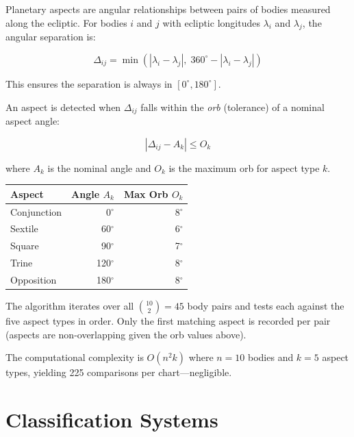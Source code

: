 \documentclass[11pt,letterpaper,twocolumn]{article}
\begin{document}
Planetary aspects are angular relationships between pairs of bodies measured along the ecliptic. For bodies $i$ and $j$ with ecliptic longitudes $\lambda_i$ and $\lambda_j$, the angular separation is:

\begin{equation}
\Delta_{ij} = \min(|\lambda_i - \lambda_j|,\; 360^\circ - |\lambda_i - \lambda_j|)
\end{equation}

This ensures the separation is always in $[0^\circ, 180^\circ]$.

An aspect is detected when $\Delta_{ij}$ falls within the \textit{orb} (tolerance) of a nominal aspect angle:

\begin{equation}
|\Delta_{ij} - A_k| \leq O_k
\end{equation}

where $A_k$ is the nominal angle and $O_k$ is the maximum orb for aspect type $k$.

\begin{center}
\begin{tabular}{lrr}
\toprule
\textbf{Aspect} & \textbf{Angle} $A_k$ & \textbf{Max Orb} $O_k$ \\
\midrule
Conjunction  & 0$^\circ$   & 8$^\circ$ \\
Sextile      & 60$^\circ$  & 6$^\circ$ \\
Square       & 90$^\circ$  & 7$^\circ$ \\
Trine        & 120$^\circ$ & 8$^\circ$ \\
Opposition   & 180$^\circ$ & 8$^\circ$ \\
\bottomrule
\end{tabular}
\end{center}

The algorithm iterates over all $\binom{10}{2} = 45$ body pairs and tests each against the five aspect types in order. Only the first matching aspect is recorded per pair (aspects are non-overlapping given the orb values above).

The computational complexity is $O(n^2 k)$ where $n = 10$ bodies and $k = 5$ aspect types, yielding 225 comparisons per chart---negligible.

\section{Classification Systems}\label{sec:class}
\end{document}
